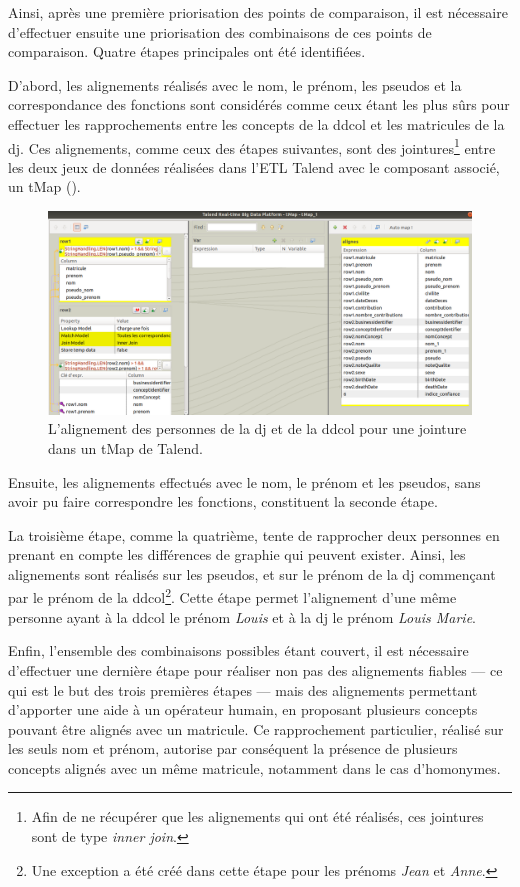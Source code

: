 Ainsi, après une première priorisation des points de comparaison, il est nécessaire d'effectuer ensuite une priorisation des combinaisons de ces points de comparaison. Quatre étapes principales ont été identifiées.

\noindent D'abord, les alignements réalisés avec le nom, le prénom, les pseudos et la correspondance des fonctions sont considérés comme ceux étant les plus sûrs pour effectuer les rapprochements entre les concepts de la \ac{ddcol} et les matricules de la \ac{dj}. Ces alignements, comme ceux des étapes suivantes, sont des jointures\footnote{Afin de ne récupérer que les alignements qui ont été réalisés, ces jointures sont de type \textit{inner join}.} entre les deux jeux de données réalisées dans l'ETL Talend avec le composant associé, un tMap ().
\begin{figure}[!h]
	\centering
	\includegraphics[width=16cm]{images/tmpa_jointure1_dj.png}
	\caption{L'alignement des personnes de la \ac{dj} et de la \ac{ddcol} pour une jointure dans un tMap de Talend.}
	\label{tmap_jointures}
\end{figure}

\noindent Ensuite, les alignements effectués avec le nom, le prénom et les pseudos, sans avoir pu faire correspondre les fonctions, constituent la seconde étape.

\noindent La troisième étape, comme la quatrième, tente de rapprocher deux personnes en prenant en compte les différences de graphie qui peuvent exister. Ainsi, les alignements sont réalisés sur les pseudos, et sur le prénom de la \ac{dj} commençant par le prénom de la \ac{ddcol}\footnote{Une exception a été créé dans cette étape pour les prénoms \textit{Jean} et \textit{Anne}.}. Cette étape permet l'alignement d'une même personne ayant à la \ac{ddcol} le prénom \textit{Louis} et à la \ac{dj} le prénom \textit{Louis Marie}.

\noindent Enfin, l'ensemble des combinaisons possibles étant couvert, il est nécessaire d'effectuer une dernière étape pour réaliser non pas des alignements fiables --- ce qui est le but des trois premières étapes --- mais des alignements permettant d'apporter une aide à un opérateur humain, en proposant plusieurs concepts pouvant être alignés avec un matricule. Ce rapprochement particulier, réalisé sur les seuls nom et prénom, autorise par conséquent la présence de plusieurs concepts alignés avec un même matricule, notamment dans le cas d'homonymes.\\

